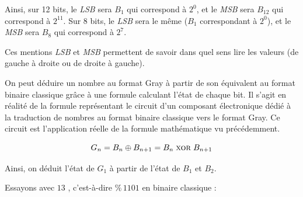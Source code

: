 \documentclass[11pt,a4paper]{article}
\begin{document}
Ainsi, sur 12 bits, le \textit{LSB} sera $ B_{1} $ qui correspond à $ 2^{0} $, et le \textit{MSB} sera $ B_{12} $ qui correspond à $ 2^{11} $.
Sur 8 bits, le \textit{LSB} sera le même ($ B_{1} $ correspondant à $ 2^{0} $), et le \textit{MSB} sera $ B_{8} $ qui correspond à $ 2^{7} $.

\medskip

Ces mentions \textit{LSB} et \textit{MSB} permettent de savoir dans quel sens lire les valeurs (de gauche à droite ou de droite à gauche).

\bigskip
\bigskip

On peut déduire un nombre au format Gray à partir de son équivalent au format binaire classique grâce à une formule calculant l'état de chaque bit.
Il s'agit en réalité de la formule représentant le circuit d'un composant électronique dédié à la traduction de nombres au format binaire classique vers le format Gray.
Ce circuit est l'application réelle de la formule mathématique vu précédemment.

\begin{equation*}
G_{n} = B_{n} \oplus B_{n + 1} = B_{n} \; \text{\textsc{xor}} \; B_{n + 1}
\end{equation*}

\medskip

Ainsi, on déduit l'état de $ G_{1} $ à partir de l'état de $ B_{1} $ et $ B_{2} $.

\bigskip
\bigskip

Essayons avec $ 13 $ , c'est-à-dire $ \text{\%} \, 1101 $ en binaire classique :

\smallskip
\end{document}
